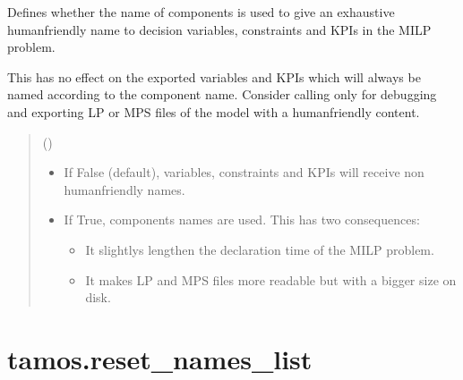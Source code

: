 \documentclass[letterpaper,10pt,english]{sphinxmanual}
\begin{document}
\begin{fulllineitems}
\label{\detokenize{generated/tamos.use_name_in_MILP:tamos.use_name_in_MILP}}
\pysigstartsignatures
{}
\pysigstopsignatures
\sphinxAtStartPar
Defines whether the name of components is used to give an exhaustive human\sphinxhyphen{}friendly name
to decision variables, constraints and KPIs in the MILP problem.

\sphinxAtStartPar
This has no effect on the exported variables and KPIs which will always be named according to the component name.
Consider calling  only for debugging and exporting LP or MPS files of the model with a
human\sphinxhyphen{}friendly content.
\begin{quote}\begin{description}
\sphinxAtStartPar
{} () \textendash{} \begin{itemize}
\item {} 
\sphinxAtStartPar
If False (default), variables, constraints and KPIs will receive non human\sphinxhyphen{}friendly names.

\item {} 
\sphinxAtStartPar
If True, components names are used.
This has two consequences:
\begin{itemize}
\item {} 
\sphinxAtStartPar
It slightlys lengthen the declaration time of the MILP problem.

\item {} 
\sphinxAtStartPar
It makes LP and MPS files more readable but with a bigger size on disk.

\end{itemize}

\end{itemize}


\end{description}\end{quote}

\end{fulllineitems}


\sphinxstepscope


\section{tamos.reset\_names\_list}
\label{\detokenize{generated/tamos.reset_names_list:tamos-reset-names-list}}\label{\detokenize{generated/tamos.reset_names_list::doc}}
\end{document}
